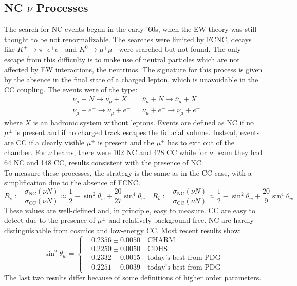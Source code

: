 \documentclass[10.75pt,a4paper,openright,bottom=2cm]{article}
\begin{document}
\subsection{NC $\nu$ Processes}
The search for NC events began in the early '60s, when the EW theory was still thought to be not renormalizable. The searches were limited by FCNC, decays like $K^+\to\pi^+e^+e^-$ and $K^0\to\mu^+\mu^-$ were searched but not found. The only escape from this difficulty is to make use of neutral particles which are not affected by EW interactions, the neutrinos. The signature for this process is given by the absence in the final state of a charged lepton, which is unavoidable in the CC coupling. The events were of the type:
\[
\begin{aligned}
&\nu_\mu+N\to\nu_\mu+X &&\overline{\nu}_\mu+N\to\overline{\nu}_\mu+X\\
&\nu_\mu+e^-\to\nu_\mu+e^- &&\overline{\nu}_\mu+e^-\to\overline{\nu}_\mu+e^-
\end{aligned}
\]
where $X$ is an hadronic system without leptons. Events are defined as NC if no $\mu^\pm$ is present and if no charged track escapes the fiducial volume. Instead, events are CC if a clearly visible $\mu^\pm$ is present and the $\mu^\pm$ has to exit out of the chamber. For $\nu$ beams, there were 102 NC and 428 CC while for $\overline{\nu}$ beam they had 64 NC and 148 CC, results consistent with the presence of NC.\\
To measure these processes, the strategy is the same as in the CC case, with a simplification due to the absence of FCNC.
\[
R_\nu:=\frac{\sigma_{\text{NC}}(\nu N)}{\sigma_{\text{CC}}(\nu N)}\approx\frac{1}{2}-\sin^2\theta_w+\frac{20}{27}\sin^4\theta_w \quad R_{\overline{\nu}}:=\frac{\sigma_{\text{NC}}(\overline{\nu} N)}{\sigma_{\text{CC}}(\overline{\nu} N)}\approx\frac{1}{2}-\sin^2\theta_w+\frac{20}{9}\sin^4\theta_w
\]
These values are well-defined and, in principle, easy to measure. CC are easy to detect due to the presence of $\mu^\pm$ and relatively background free. NC are hardly distinguishable from cosmics and low-energy CC. Most recent results show:
\[
\sin^2\theta_w=
\left\{
\begin{aligned}
&0.2356\pm0.0050 \quad \text{CHARM}\\
&0.2250\pm0.0050 \quad \text{CDHS}\\
&0.2332\pm0.0015 \quad \text{today's best from PDG}\\
&0.2251\pm0.0039 \quad \text{today's best from PDG}
\end{aligned}
\right.
\]
The last two results differ because of some definitions of higher order parameters.\\
\end{document}
